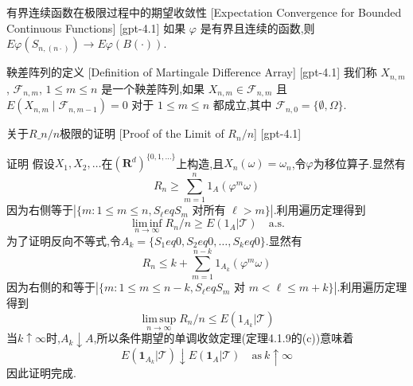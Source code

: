 \documentclass[UTF8]{ctexart}
\begin{document}
    
    
    \begin{lma}
        {有界连续函数在极限过程中的期望收敛性}
        [Expectation Convergence for Bounded Continuous Functions]
        [gpt-4.1]
        如果 $\varphi$ 是有界且连续的函数,则 $E\varphi(S_{n,(n\cdot)}) \to E\varphi(B(\cdot))$.
    \end{lma}
    
    
    
    \begin{dfn}
        {鞅差阵列的定义}
        [Definition of Martingale Difference Array]
        [gpt-4.1]
        我们称 $X_{n,m}$, $\mathcal{F}_{n,m}$, $1 \leq m \leq n$ 是一个鞅差阵列,如果 $X_{n,m} \in \mathcal{F}_{n,m}$ 且 $E( X_{n,m} \mid \mathcal{F}_{n,m-1} ) = 0$ 对于 $1 \leq m \leq n$ 都成立,其中 $\mathcal{F}_{n,0} = \{ \emptyset, \Omega \}$.
    \end{dfn}
    
    
    
    \begin{prf}
        {关于$R\_n/n$极限的证明}
        [Proof of the Limit of $R_n/n$]
        [gpt-4.1]
        
证明 假设$X_1, X_2, \dots$在$(\mathbf{R}^d)^{\{0,1,\ldots\}}$上构造,且$X_n(\omega) = \omega_n$,令$\varphi$为移位算子.显然有
\[
R_n \geq \sum_{m=1}^{n} 1_A(\varphi^m \omega)
\]
因为右侧等于$|\{m: 1 \leq m \leq n, S_\ell 
eq S_m \text{ 对所有 } \ell > m\}|$.利用遍历定理得到
\[
\operatorname*{lim\,inf}_{n \to \infty} R_n / n \geq E(1_A|\mathcal{T}) \quad \mathrm{a.s.}
\]
为了证明反向不等式,令$A_k = \{ S_1 
eq 0, S_2 
eq 0, \ldots, S_k 
eq 0 \}$.显然有
\[
R_n \leq k + \sum_{m=1}^{n-k} 1_{A_k}(\varphi^m \omega)
\]
因为右侧的和等于$|\{ m : 1 \leq m \leq n-k, S_\ell 
eq S_m \text{ 对 } m < \ell \leq m+k\}|$.利用遍历定理得到
\[
\operatorname*{lim\,sup}_{n \to \infty} R_n / n \leq E(1_{A_k}|\mathcal{T})
\]
当$k \uparrow \infty$时,$A_k \downarrow A$,所以条件期望的单调收敛定理(定理4.1.9的(c))意味着
\[
E(\boldsymbol{1}_{A_k}|\mathcal{T}) \downarrow E(\boldsymbol{1}_{A}|\mathcal{T}) \quad \mathrm{as\ } k \uparrow \infty
\]
因此证明完成.

    \end{prf}
    
    
    
\end{document}
